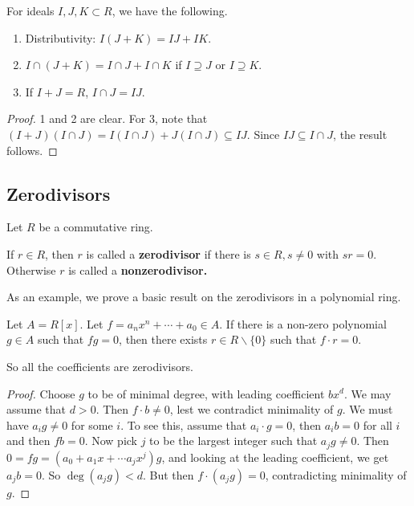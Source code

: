 \begin{proposition}
For ideals $I, J, K \subset R$, we have the following.

\begin{enumerate}
  \item Distributivity: $I(J + K) = IJ + IK$.
  \item $I \cap (J + K) = I \cap J + I \cap K$ if $I \supseteq J$ or $I \supseteq K$.
  \item If $I + J = R$, $I \cap J = IJ$.
\end{enumerate}

\begin{proof}
1 and 2 are clear.  For 3, note that $(I + J)(I \cap J) = I(I \cap J)
+ J(I \cap J) \subseteq IJ$.  Since $IJ \subseteq I \cap J$, the result
follows.
\end{proof}
\end{proposition}

\subsection{Zerodivisors}


Let $R$ be a commutative ring.
\begin{definition} 
If $r \in R$, then $r$ is called  a \textbf{zerodivisor} if there is $s \in R, s
\neq 0$ with $sr = 0$. Otherwise $r$ is called a \textbf{nonzerodivisor.}
\end{definition} 

As an example, we prove a basic result on the zerodivisors in a polynomial ring.

\begin{proposition}
Let $A=R[x]$. Let $f=a_nx^n+\cdots +a_0\in A$. If there is a non-zero polynomial $g\in
A$ such that $fg=0$, then there exists $r\in R\smallsetminus\{0\}$ such that $f\cdot
 r=0$.
\end{proposition}
So all the coefficients are zerodivisors.
\begin{proof}
 Choose $g$ to be of minimal degree, with leading coefficient $bx^d$. We may assume
 that  $d>0$. Then $f\cdot b\neq 0$, lest we contradict minimality of $g$. We must have
$a_i g\neq 0$ for some $i$. To see this, assume that $a_i\cdot g=0$, then $a_ib=0$ for
all $i$ and then $fb=0$. Now pick $j$ to be the largest integer such that $a_jg\neq
   0$. Then $0=fg=(a_0 + a_1x + \cdots a_jx^j)g$, and looking at the leading coefficient,
   we get $a_jb=0$. So $\deg (a_jg)<d$. But then $f\cdot (a_jg)=0$, contradicting
   minimality of $g$.
 \end{proof}

